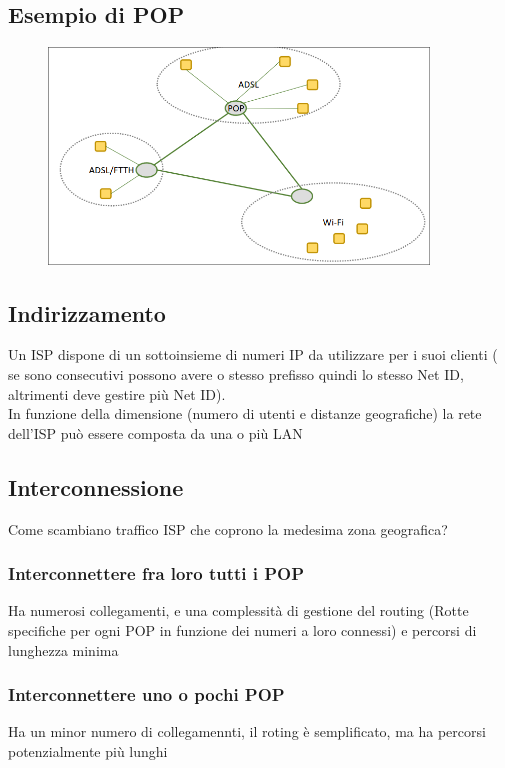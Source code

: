 \documentclass{report}
\begin{document}
                \subsection{Esempio di POP}
                    \begin{figure}[H]
                        \includegraphics[width=0.9\textwidth]{3/esPop.png}
                    \end{figure}
                \subsection{Indirizzamento}
                    Un ISP dispone di un sottoinsieme di numeri IP da utilizzare per i suoi clienti ( se sono consecutivi possono avere o stesso prefisso quindi lo stesso Net ID, altrimenti deve gestire più Net ID).
                    \\
                    In funzione della dimensione (numero di utenti e distanze geografiche) la rete dell'ISP può essere composta da una o più LAN
                \subsection{Interconnessione}
                    Come scambiano traffico ISP che coprono la medesima zona geografica?
                    \subsubsection{Interconnettere fra loro tutti i POP}
                        Ha numerosi collegamenti, e una complessità di gestione del routing (Rotte specifiche per ogni POP in funzione dei numeri a loro connessi) e percorsi di lunghezza minima
                    \subsubsection{Interconnettere uno o pochi POP}
                        Ha un minor numero di collegamennti, il roting è semplificato, ma ha percorsi potenzialmente più lunghi
\end{document}
